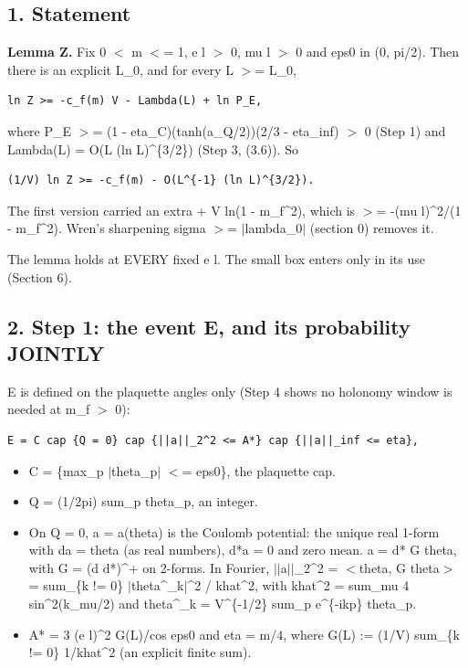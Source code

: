 \documentclass[11pt,a4paper]{article}
\begin{document}
\subsection*{1. Statement}
{\bfseries\boldmath Lemma Z.} Fix 0 $<$ m $<$= 1, e l $>$ 0, mu l $>$ 0 and eps0 in (0, pi/2). Then there is an explicit L\_0, and for every
L $>$= L\_0,

\begin{Verbatim}[breaklines=true,breakanywhere=true,fontsize=\small]
ln Z >= -c_f(m) V - Lambda(L) + ln P_E,
\end{Verbatim}

where P\_E $>$= (1 - eta\_C)(tanh(a\_Q/2))(2/3 - eta\_inf) $>$ 0 (Step 1) and Lambda(L) = O(L (ln L)\textasciicircum{}\{3/2\}) (Step 3, (3.6)).
So

\begin{Verbatim}[breaklines=true,breakanywhere=true,fontsize=\small]
(1/V) ln Z >= -c_f(m) - O(L^{-1} (ln L)^{3/2}).
\end{Verbatim}

The first version carried an extra + V ln(1 - m\_f\textasciicircum{}2), which is $>$= -(mu l)\textasciicircum{}2/(1 - m\_f\textasciicircum{}2). Wren's sharpening
sigma $>$= $|$lambda\_0$|$ (section 0) removes it.

The lemma holds at EVERY fixed e l. The small box enters only in its use (Section 6).


\subsection*{2. Step 1: the event E, and its probability JOINTLY}
E is defined on the plaquette angles only (Step 4 shows no holonomy window is needed at m\_f $>$ 0):

\begin{Verbatim}[breaklines=true,breakanywhere=true,fontsize=\small]
E = C cap {Q = 0} cap {||a||_2^2 <= A*} cap {||a||_inf <= eta},
\end{Verbatim}

\begin{itemize}
\item{} C = \{max\_p $|$theta\_p$|$ $<$= eps0\}, the plaquette cap.
\item{} Q = (1/2pi) sum\_p theta\_p, an integer.
\item{} On Q = 0, a = a(theta) is the Coulomb potential: the unique real 1-form with da = theta (as real numbers),
d*a = 0 and zero mean. a = d* G theta, with G = (d d*)\textasciicircum{}+ on 2-forms. In Fourier, $|$$|$a$|$$|$\_2\textasciicircum{}2 = $<$theta, G theta$>$ =
sum\_\{k != 0\} $|$theta\textasciicircum{}\_k$|$\textasciicircum{}2 / khat\textasciicircum{}2, with khat\textasciicircum{}2 = sum\_mu 4 sin\textasciicircum{}2(k\_mu/2) and theta\textasciicircum{}\_k = V\textasciicircum{}\{-1/2\} sum\_p e\textasciicircum{}\{-ikp\} theta\_p.
\item{} A* = 3 (e l)\textasciicircum{}2 G(L)/cos eps0 and eta = m/4, where G(L) := (1/V) sum\_\{k != 0\} 1/khat\textasciicircum{}2 (an explicit finite sum).
\end{itemize}
\end{document}
